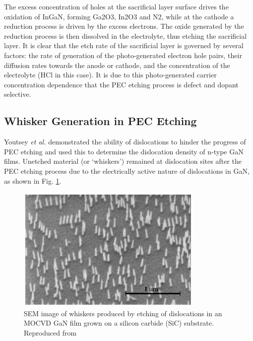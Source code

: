 The excess concentration of holes at the sacrificial layer surface drives the oxidation of InGaN, forming Ga2O3, In2O3 and N2, while at the cathode a reduction process is driven by the excess electrons. The oxide generated by the reduction process is then dissolved in the electrolyte, thus etching the sacrificial layer. It is clear that the etch rate of the sacrificial layer is governed by several factors: the rate of generation of the photo-generated electron hole pairs, their diffusion rates towards the anode or cathode, and the concentration of the electrolyte (HCl in this case). It is due to this photo-generated carrier concentration dependence that the PEC etching process is defect and dopant selective.

\subsection{Whisker Generation in PEC Etching}
Youtsey \textit{et al.} demonstrated the ability of dislocations to hinder the progress of PEC etching and used this to determine the dislocation density of n-type GaN films. Unetched material (or ‘whiskers’) remained at dislocation sites after the PEC etching process due to the electrically active nature of dislocations in GaN, as shown in Fig. \ref{PECwhiskeryoutsey}.

\begin{figure}[h]
 	\centering
 	\includegraphics[width=0.8\textwidth]{Figs/Ch4/youtseywhisker.png}
 	\caption {SEM image of whiskers produced by etching of dislocations in an MOCVD GaN film grown on a silicon carbide (SiC) substrate. Reproduced from \cite{Youtsey1999}}
 	\label{PECwhiskeryoutsey}
\end{figure}
\FloatBarrier 

